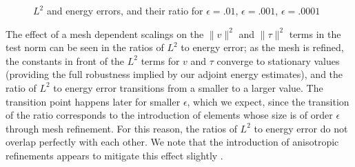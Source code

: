 \begin{figure}[h!]
\centering
{}
\caption{$L^2$ and energy errors, and their ratio for $\epsilon=.01$, $\epsilon=.001$, $\epsilon=.0001$}
\label{ratios_simple}
\end{figure}
The effect of a mesh dependent scalings on the $\|v\|^2$ and $\|\tau\|^2$ terms in the test norm can be seen in the ratios of $L^2$ to energy error; as the mesh is refined, the constants in front of the $L^2$ terms for $v$ and $\tau$ converge to stationary values (providing the full robustness implied by our adjoint energy estimates), and the ratio of $L^2$ to energy error transitions from a smaller to a larger value.  The transition point happens later for smaller $\epsilon$, which we expect, since the transition of the ratio corresponds to the introduction of elements whose size is of order $\epsilon$ through mesh refinement.  For this reason, the ratios of $L^2$ to energy error do not overlap perfectly with each other.  We note that the introduction of anisotropic refinements appears to mitigate this effect slightly \cite{DPGrobustness}.

